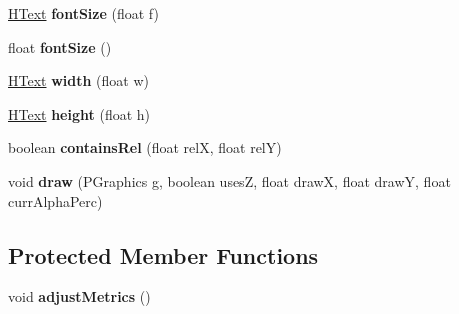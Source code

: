 \begin{DoxyCompactItemize}
\item 
\hypertarget{classhype_1_1drawable_1_1_h_text_a8972dfdc3677f1477da78d43a65c8bc9}{\hyperlink{classhype_1_1drawable_1_1_h_text}{H\-Text} {\bfseries font\-Size} (float f)}\label{classhype_1_1drawable_1_1_h_text_a8972dfdc3677f1477da78d43a65c8bc9}

\item 
\hypertarget{classhype_1_1drawable_1_1_h_text_aa0c33b11fb4c2adb4ff564fd8647df16}{float {\bfseries font\-Size} ()}\label{classhype_1_1drawable_1_1_h_text_aa0c33b11fb4c2adb4ff564fd8647df16}

\item 
\hypertarget{classhype_1_1drawable_1_1_h_text_a34d2ed02a16e5cfde7a1234c81752405}{\hyperlink{classhype_1_1drawable_1_1_h_text}{H\-Text} {\bfseries width} (float w)}\label{classhype_1_1drawable_1_1_h_text_a34d2ed02a16e5cfde7a1234c81752405}

\item 
\hypertarget{classhype_1_1drawable_1_1_h_text_aa5de72954d2566d756b8f215fec23a1b}{\hyperlink{classhype_1_1drawable_1_1_h_text}{H\-Text} {\bfseries height} (float h)}\label{classhype_1_1drawable_1_1_h_text_aa5de72954d2566d756b8f215fec23a1b}

\item 
\hypertarget{classhype_1_1drawable_1_1_h_text_a0e58a8da08b4b63657be00cbc8a317ec}{boolean {\bfseries contains\-Rel} (float rel\-X, float rel\-Y)}\label{classhype_1_1drawable_1_1_h_text_a0e58a8da08b4b63657be00cbc8a317ec}

\item 
\hypertarget{classhype_1_1drawable_1_1_h_text_a45d252ab33bf417402736b7f3c5476b8}{void {\bfseries draw} (P\-Graphics g, boolean uses\-Z, float draw\-X, float draw\-Y, float curr\-Alpha\-Perc)}\label{classhype_1_1drawable_1_1_h_text_a45d252ab33bf417402736b7f3c5476b8}

\end{DoxyCompactItemize}
\subsection*{Protected Member Functions}
\begin{DoxyCompactItemize}
\item 
\hypertarget{classhype_1_1drawable_1_1_h_text_a9453318bde7a8e17a0624fc73da871f2}{void {\bfseries adjust\-Metrics} ()}\label{classhype_1_1drawable_1_1_h_text_a9453318bde7a8e17a0624fc73da871f2}

\end{DoxyCompactItemize}
